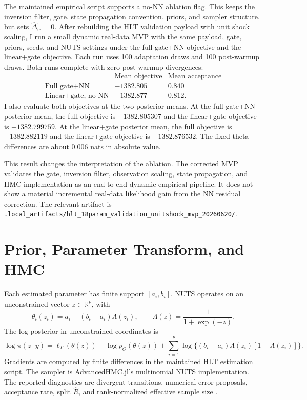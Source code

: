 \documentclass[12pt]{article}
\newcommand{\R}{\mathbb{R}}
\newcommand{\given}{\,|\,}
\begin{document}
The maintained empirical script supports a no-NN ablation flag. This keeps the
inversion filter, gate, state propagation convention, priors, and sampler
structure, but sets
\(\widehat{\Delta}_w=0\). After rebuilding the HLT validation payload with
unit shock scaling, I run a small dynamic real-data MVP with the same payload,
gate, priors, seeds, and NUTS settings under the full gate+NN objective and the
linear+gate objective. Each run uses 100 adaptation draws and 100 post-warmup
draws. Both runs complete with zero post-warmup divergences:
\[
\begin{array}{lcc}
 & \text{Mean objective} & \text{Mean acceptance} \\
\text{Full gate+NN} & -1382.805 & 0.840 \\
\text{Linear+gate, no NN} & -1382.877 & 0.812 .
\end{array}
\]
I also evaluate both objectives at the two posterior means. At the full gate+NN
posterior mean, the full objective is \(-1382.805307\) and the linear+gate
objective is \(-1382.799759\). At the linear+gate posterior mean, the full
objective is \(-1382.882119\) and the linear+gate objective is
\(-1382.876532\). The fixed-theta differences are about \(0.006\) nats in
absolute value.

This result changes the interpretation of the ablation. The corrected MVP
validates the gate, inversion filter, observation scaling, state propagation,
and HMC implementation as an end-to-end dynamic empirical pipeline. It does not
show a material incremental real-data likelihood gain from the NN residual
correction. The relevant artifact is
\texttt{.local\_artifacts/hlt\_18param\_validation\_unitshock\_mvp\_20260620/}.

\section{Prior, Parameter Transform, and HMC}
\label{apptech:hmc}

Each estimated parameter has finite support \([a_i,b_i]\). NUTS operates on an
unconstrained vector \(z\in\R^p\), with
\[
  \theta_i(z_i)
  =
  a_i + (b_i-a_i)\Lambda(z_i),
  \qquad
  \Lambda(z)=\frac{1}{1+\exp(-z)}.
\]
The log posterior in unconstrained coordinates is
\begin{equation}
  \log \pi(z\given y)
  =
  \ell_T(\theta(z))
  +
  \log p_\Theta(\theta(z))
  +
  \sum_{i=1}^p
  \log\{(b_i-a_i)\Lambda(z_i)[1-\Lambda(z_i)]\}.
\label{eq:tech_unconstrained_posterior}
\end{equation}
Gradients are computed by finite differences in the maintained HLT estimation
script. The sampler is AdvancedHMC.jl's multinomial NUTS implementation. The
reported diagnostics are divergent transitions, numerical-error proposals,
acceptance rate, split \(\widehat R\), and rank-normalized effective sample size
\citep{vehtari2021rank}.
\end{document}
